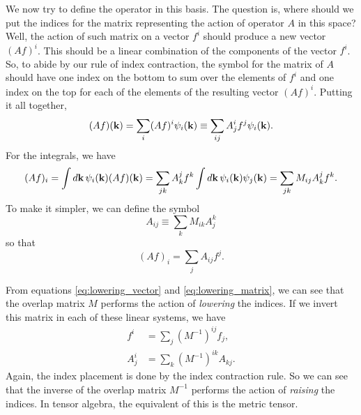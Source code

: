 \documentclass[12pt]{article}
\begin{document}
We now try to define the operator in this basis. The question is, where should we put the indices
for the matrix representing the action of operator $A$ in this space? Well, the action of such
matrix on a vector $f^i$ should produce a new vector $(Af)^i$. This should be a linear combination
of the components of the vector $f^i$. So, to abide by our rule of index contraction, the symbol for
the matrix of $A$ should have one index on the bottom to sum over the elements of $f^i$ and one index
on the top for each of the elements of the resulting vector $(Af)^i$. Putting it all together,
\begin{equation}
    (Af)(\vb{k}) = \sum_i (Af)^i \psi_i(\vb{k}) \equiv \sum_{ij} A^i_j f^j \psi_i(\vb{k}).
\end{equation}
For the integrals, we have
\begin{equation}
    (Af)_i = \int\dd{\vb{k}} \psi_i(\vb{k}) (Af)(\vb{k}) = \sum_{jk} A^j_kf^k
    \int\dd{\vb{k}} \psi_i(\vb{k})\psi_j(\vb{k}) = \sum_{jk} M_{ij} A^j_k f^k.
    \label{eq:integral}
\end{equation}
To make it simpler, we can define the symbol
\begin{equation}
    A_{ij} \equiv \sum_k M_{ik} A^k_j
    \label{eq:lowering_matrix}
\end{equation}
so that
\begin{equation}
    (Af)_i = \sum_j A_{ij} f^j.
    \label{eq:integral_matrix}
\end{equation}

From equations \eqref{eq:lowering_vector} and \eqref{eq:lowering_matrix}, we can see that the
overlap matrix $M$ performs the action of \emph{lowering} the indices. If we invert this matrix
in each of these linear systems, we have
\begin{align}
    f^i &= \sum_j (M^{-1})^{ij} f_j, \\
    A^i_j &= \sum_k (M^{-1})^{ik} A_{kj}.
\end{align}
Again, the index placement is done by the index contraction rule. So we can see that the inverse of
the overlap matrix $M^{-1}$ performs the action of \emph{raising} the indices. In tensor algebra,
the equivalent of this is the metric tensor.
\end{document}
